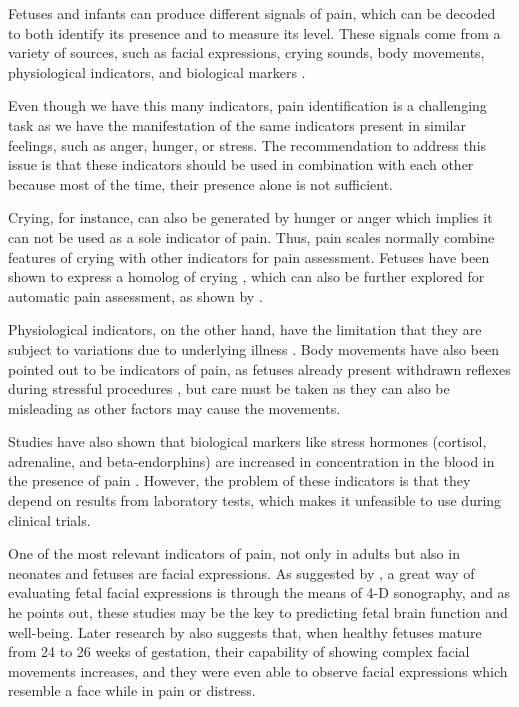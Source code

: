 Fetuses and infants can produce different signals of pain, which can be decoded to both identify its presence and to measure its level. These signals come from a variety of sources, such as facial expressions, crying sounds, body movements, physiological indicators, and biological markers \citep{Bellieni2012}. 

Even though we have this many indicators, pain identification is a challenging task as we have the manifestation of the same indicators present in similar feelings, such as anger, hunger, or stress. The recommendation to address this issue is that these indicators should be used in combination with each other \citep{Bellieni2012} because most of the time, their presence alone is not sufficient. 

Crying, for instance, can also be generated by hunger or anger which implies it can not be used as a sole indicator of pain.  Thus, pain scales normally combine features of crying with other indicators for pain assessment. Fetuses have been shown to express a homolog of crying \citep{Gingras2005}, which can also be further explored for automatic pain assessment, as shown by \cite{abs-1909-02543}. 

Physiological indicators, on the other hand, have the limitation that they are subject to variations due to underlying illness \citep{sweet1998physiological}. Body movements have also been pointed out to be indicators of pain, as fetuses already present withdrawn reflexes during stressful procedures \citep{Zimmermann1991}, but care must be taken as they can also be misleading as other factors may cause the movements.

Studies have also shown that biological markers like stress hormones (cortisol, adrenaline, and beta-endorphins) are increased in concentration in the blood in the presence of pain \citep{giannakoulopoulos1994fetal}. However, the problem of these indicators is that they depend on results from laboratory tests, which makes it unfeasible to use during clinical trials.

One of the most relevant indicators of pain, not only in adults but also in neonates and fetuses are facial expressions. As suggested by \cite{Yan2006}, a great way of evaluating fetal facial expressions is through the means of 4-D sonography, and as he points out, these studies may be the key to predicting fetal brain function and well-being. Later research by \cite{Reissland2011, Reissland2013} also suggests that, when healthy fetuses mature from 24 to 26 weeks of gestation, their capability of showing complex facial movements increases, and they were even able to observe facial expressions which resemble a face while in pain or distress.

